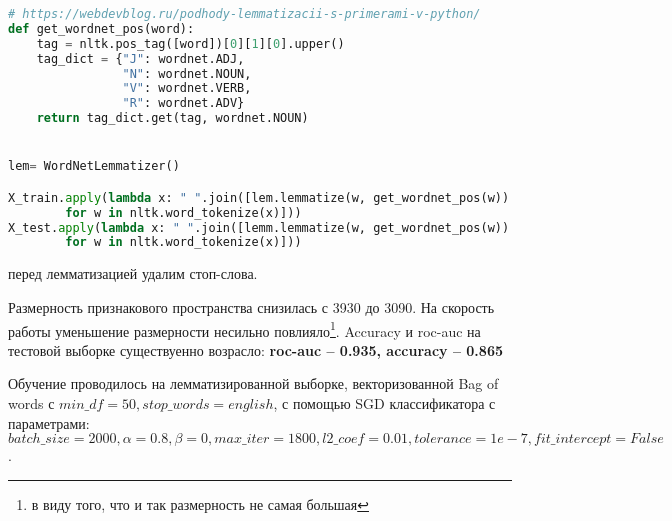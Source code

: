 \documentclass[12pt,fleqn]{article}
\begin{document}
\begin{lstlisting}[language=Python, caption=Lemmatizer,label=code:lemm]
# https://webdevblog.ru/podhody-lemmatizacii-s-primerami-v-python/
def get_wordnet_pos(word):
    tag = nltk.pos_tag([word])[0][1][0].upper()
    tag_dict = {"J": wordnet.ADJ,
                "N": wordnet.NOUN,
                "V": wordnet.VERB,
                "R": wordnet.ADV}
    return tag_dict.get(tag, wordnet.NOUN)


lem= WordNetLemmatizer()

X_train.apply(lambda x: " ".join([lem.lemmatize(w, get_wordnet_pos(w)) 
        for w in nltk.word_tokenize(x)]))
X_test.apply(lambda x: " ".join([lemm.lemmatize(w, get_wordnet_pos(w)) 
        for w in nltk.word_tokenize(x)]))
\end{lstlisting}

 перед лемматизацией удалим стоп-слова.

Размерность признакового пространства снизилась с 3930 до 3090. На скорость работы
уменьшение размерности несильно повлияло\footnote{в виду того, что и так размерность не самая большая}.
Accuracy и roc-auc на тестовой выборке существуенно возрасло:
\textbf{roc-auc -- 0.935, accuracy -- 0.865}

Обучение проводилось на лемматизированной выборке, векторизованной Bag of words с 
$min\_df=50, stop\_words=english$,
с помощью SGD классификатора с параметрами:\newline
$batch\_size=2000, \alpha = 0.8, \beta = 0, max\_iter=1800, l2\_coef=0.01, tolerance=1e-7,
fit\_intercept=False$.

\newpage
\end{document}
